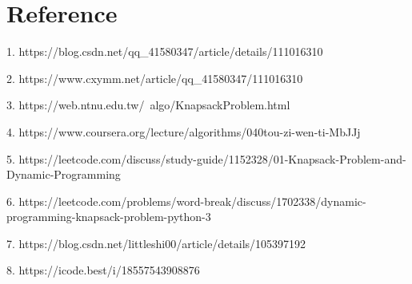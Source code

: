 \documentclass[10pt,UTF8]{ctexart}
\begin{document}

\section{Reference}

1. https://blog.csdn.net/qq\_41580347/article/details/111016310

2. https://www.cxymm.net/article/qq\_41580347/111016310

3. https://web.ntnu.edu.tw/~algo/KnapsackProblem.html

4. https://www.coursera.org/lecture/algorithms/040tou-zi-wen-ti-MbJJj

5. https://leetcode.com/discuss/study-guide/1152328/01-Knapsack-Problem-and-Dynamic-Programming

6. https://leetcode.com/problems/word-break/discuss/1702338/dynamic-programming-knapsack-problem-python-3

7. https://blog.csdn.net/littleshi00/article/details/105397192

8. https://icode.best/i/18557543908876












\clearpage
\end{document}
